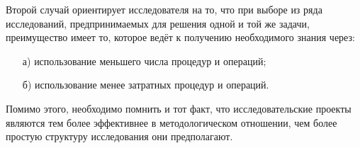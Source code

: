 Второй случай ориентирует исследователя на то, что при выборе из ряда
исследований, предпринимаемых для решения одной и той же задачи,
преимущество имеет то, которое ведёт к получению необходимого знания
через:
\begin{enumerate}
	\item[а)]  использование меньшего числа процедур и операций;
	\item[б)]  использование менее затратных процедур и операций.
\end{enumerate}
Помимо этого, необходимо помнить и тот факт, что исследовательские
проекты являются тем более эффективнее в методологическом отношении, чем
более простую структуру исследования они предполагают. \cite{lit5}
